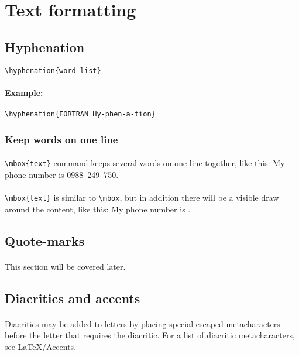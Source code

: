 \documentclass[11pt,a4paper]{article}
\begin{document}
\tableofcontents
\newpage
\section{Text formatting}
\subsection{Hyphenation}
\begin{verbatim}
\hyphenation{word list}
\end{verbatim}

\paragraph{Example:}
\begin{verbatim}
\hyphenation{FORTRAN Hy-phen-a-tion}
\end{verbatim}
\subsubsection{Keep words on one line}

\paragraph{}
\verb|\mbox{text}| command keeps several words on one line together, like this:
My phone number is \mbox{0988 249 750}.
\paragraph{}
\verb|\mbox{text}| is similar to \verb|\mbox|, but in addition there will be a visible
draw around the content, like this: My phone number is .


\subsection{Quote-marks}

\paragraph{}
This section will be covered later.

\subsection{Diacritics and accents}
\paragraph{}
Diacritics may be added to letters by placing special escaped metacharacters before the letter
that requires the diacritic. For a list of diacritic metacharacters, see \LaTeX{}\slash Accents.
\end{document}
